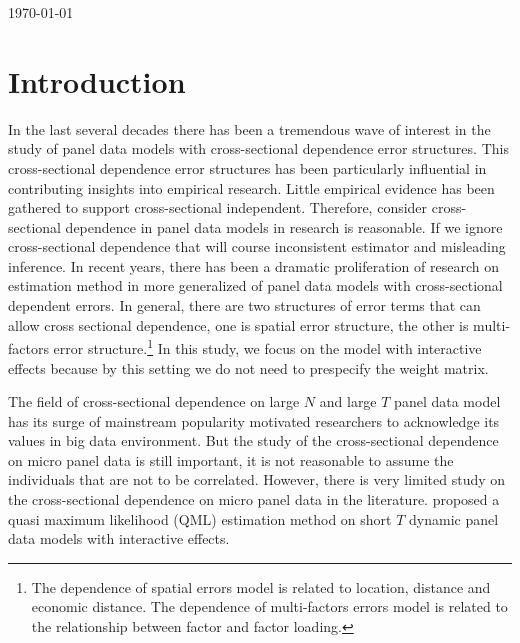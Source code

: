 \documentclass[12pt,a4paper,hyperref]{article}
\begin{document}
\begin{titlepage}


{\large \today}\\[2cm] %


\vfill %





\end{titlepage}




\newpage
\tableofcontents
\newpage
\section{Introduction}


In the last several decades there has been a tremendous wave of interest in the study of panel data models with cross-sectional dependence error structures. This cross-sectional dependence error structures has been particularly influential in contributing insights into empirical research. Little empirical evidence has been gathered to support cross-sectional independent. Therefore, consider cross-sectional dependence in panel data models in research is reasonable. If we ignore cross-sectional dependence that will course inconsistent estimator and misleading inference. In recent years, there has been a dramatic proliferation of research on estimation method in more generalized of panel data models with cross-sectional dependent errors. In general, there are two structures of error terms that can allow cross sectional dependence, one is spatial error structure, the other is multi-factors error structure.\footnote{The dependence of spatial errors model is related to location, distance and economic distance. The dependence of multi-factors errors model is related to the relationship between factor and factor loading. } In this study, we focus on the model with interactive effects because by this setting we do not need to prespecify the weight matrix.

The field of cross-sectional dependence on large $N$ and large $T$ panel data model has its surge of mainstream popularity motivated researchers to acknowledge its values in big data environment. But the study of the cross-sectional dependence on micro panel data is still important, it is not reasonable to assume the individuals that are not to be correlated.
 However, there is very limited study on the cross-sectional dependence on micro panel data in the literature. \citet{Hayakawa:2018} proposed a quasi maximum likelihood (QML) estimation method on short $T$ dynamic panel data models with interactive effects.
\end{document}

